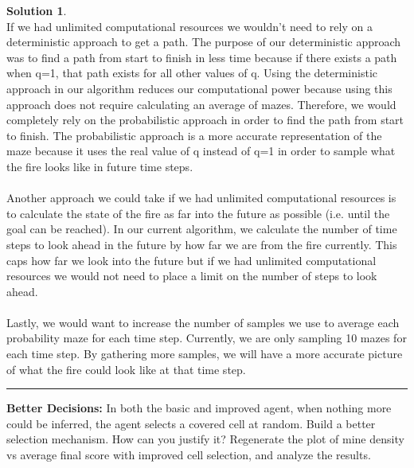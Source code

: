 \documentclass{article}
\theoremstyle{definition}
\def\fline{\rule{0.75\linewidth}{0.5pt}}
\newcommand{\finishline}{\vspace{-15pt}\begin{center}\fline\end{center}}
\newtheorem*{solution*}{Solution}
\newenvironment{solution}{\begin{solution*}}{{\finishline} \end{solution*}}
\begin{document}
\begin{solution} \hfill \\
	If we had unlimited computational resources we wouldn't need to rely on a deterministic approach to get a path. The purpose of our deterministic approach was to find a path from start to finish in less time because if there exists a path when q=1, that path exists for all other values of q. Using the deterministic approach in our algorithm reduces our computational power because using this approach does not require calculating an average of mazes. Therefore, we would completely rely on the probabilistic approach in order to find the path from start to finish. The probabilistic approach is a more accurate representation of the maze because it uses the real value of q instead of q=1 in order to sample what the fire looks like in future time steps. \\ \\
	Another approach we could take if we had unlimited computational resources is to calculate the state of the fire as far into the future as possible (i.e. until the goal can be reached). In our current algorithm, we calculate the number of time steps to look ahead in the future by how far we are from the fire currently. This caps how far we look into the future but if we had unlimited computational resources we would not need to place a limit on the number of steps to look ahead. \\ \\
    Lastly, we would want to increase the number of samples we use to average each probability maze for each time step. Currently, we are only sampling 10 mazes for each time step. By gathering more samples, we will have a more accurate picture of what the fire could look like at that time step. \\
\end{solution}

\smallskip

\textbf{Better Decisions: }
	In both the basic and improved agent, when nothing more could be inferred, the agent selects a covered cell at random. Build a better selection mechanism. How can you justify it? Regenerate the plot of mine density vs average final score with improved cell selection, and analyze the results.



\smallskip
\end{document}
